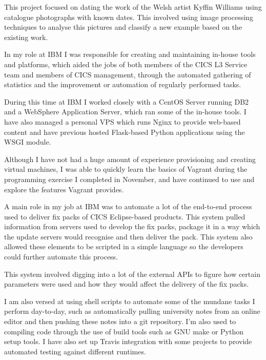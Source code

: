 \documentclass[10pt,stdletter,dateno,sigleft]{newlfm} %
\begin{document}
\begin{newlfm}
This project focused on dating the work of the Welsh artist Kyffin Williams 
using catalogue photographs with known dates. This involved using image 
processing techniques to analyse this pictures and classify a new example based
on the existing work.

In my role at IBM I was responsible for creating and maintaining in-house tools and 
platforms, which aided the jobs of both members of the CICS L3 Service team and members
of CICS management, through the automated gathering of statistics and the 
improvement or automation of regularly performed tasks.

During this time at IBM I worked closely with a CentOS Server running DB2 and a WebSphere 
Application Server, which ran some of the in-house tools. I have also managed a
personal VPS which runs Nginx to provide web-based content and have previous
hosted Flask-based Python applications using the WSGI module.

Although I have not had a huge amount of experience provisioning and creating 
virtual machines, I was able to quickly learn the basics of Vagrant during the
programming exercise I completed in November, and have continued to use and 
explore the features Vagrant provides. %

A main role in my job at IBM was to automate a lot of the end-to-end process 
used to deliver fix packs of CICS Eclipse-based products. This system pulled
information from servers used to develop the fix packs, package it in a way 
which the update servers would recognise and then deliver the pack.
This system also allowed these elements to be scripted in a simple language so
the developers could further automate this process.

This system involved digging into a lot of the external APIs to figure how
certain parameters were used and how they would affect the delivery of the fix
packs.

I am also versed at using shell scripts to automate some of the mundane tasks
I perform day-to-day, such as automatically pulling university notes from an
online editor and then pushing these notes into a git repository. I'm also
used to compiling code through the use of build tools such as GNU make or 
Python setup tools. I have also set up Travis integration with some projects to
provide automated testing against different runtimes.



\end{newlfm}
\end{document}
